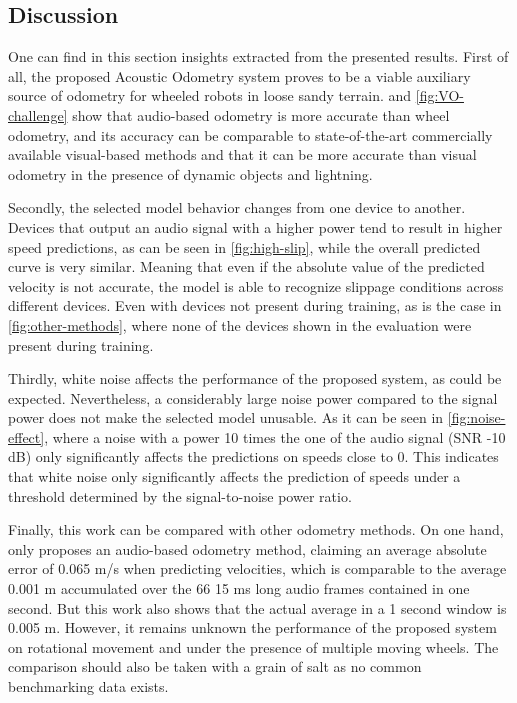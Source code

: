 \subsection{Discussion} \label{sec:discussion}

One can find in this section insights extracted from the presented results.
First of all, the proposed Acoustic Odometry system proves to be a viable
auxiliary source of odometry for wheeled robots in loose sandy terrain.
 and \cref{fig:VO-challenge} show that audio-based
odometry is more accurate than wheel odometry, and its accuracy can be
comparable to state-of-the-art commercially available visual-based methods and
that it can be more accurate than visual odometry in the presence of dynamic
objects and lightning. 

Secondly, the selected model behavior changes from one device to another.
Devices that output an audio signal with a higher power tend to result in
higher speed predictions, as can be seen in \cref{fig:high-slip}, while the
overall predicted curve is very similar. Meaning that even if the absolute
value of the predicted velocity is not accurate, the model is able to recognize
slippage conditions across different devices. Even with devices not present
during training, as is the case in \cref{fig:other-methods}, where none of the
devices shown in the evaluation were present during training.

Thirdly, white noise affects the performance of the proposed system, as could
be expected. Nevertheless, a considerably large noise power compared to the
signal power does not make the selected model unusable. As it can be seen in
\cref{fig:noise-effect}, where a noise with a power 10 times the one of the
audio signal (SNR -10 dB) only significantly affects the predictions on
speeds close to 0. This indicates that white noise only significantly affects
the prediction of speeds under a threshold determined by the signal-to-noise
power ratio.

Finally, this work can be compared with other odometry methods. On one hand,
only \cite{marchegiani2018a} proposes an audio-based odometry method, claiming
an average absolute error of 0.065 m/s when predicting velocities, which is
comparable to the average  0.001 m accumulated over the 66
15 ms long audio frames contained in one second. But this work also shows that
the actual average  in a 1 second window is 0.005 m. However,
it remains unknown the performance of the proposed system on rotational
movement and under the presence of multiple moving wheels. The comparison
should also be taken with a grain of salt as no common benchmarking data
exists.

